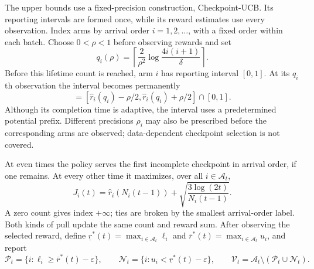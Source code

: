 \documentclass[11pt]{article}
\theoremstyle{remark}
\begin{document}
The upper bounds use a fixed-precision construction, Checkpoint-UCB. Its
reporting intervals are formed once, while its reward estimates use every
observation. Index arms by arrival order $i=1,2,\ldots$, with a fixed order
within each batch. Choose $0<\rho<1$ before observing rewards and set
\begin{equation}
 q_i(\rho)=\left\lceil\frac2{\rho^2}
                  \log\frac{4i(i+1)}\delta\right\rceil.
 \label{eq:checkpoint}
\end{equation}
Before this lifetime count is reached, arm $i$ has reporting interval $[0,1]$.
At its $q_i$th observation the interval becomes permanently
\begin{equation}
 [\ell_i,u_i]=[\hat r_i(q_i)-\rho/2,
                 \hat r_i(q_i)+\rho/2]\cap[0,1].
 \label{eq:fixed_interval}
\end{equation}
Although its completion time is adaptive, the
interval uses a predetermined potential prefix. Different precisions
$\rho_i$ may also be prescribed before the corresponding arms are observed;
data-dependent checkpoint selection is not covered.

At even times the policy serves the first incomplete checkpoint in arrival
order, if one remains. At every other time it maximizes, over all
$i\in\mathcal A_t$,
\begin{equation}
 J_i(t)=\hat r_i(N_i(t-1))+
             \sqrt{\frac{3\log(2t)}{N_i(t-1)}}.
 \label{eq:ucb}
\end{equation}
A zero count gives index $+\infty$; ties are broken by the smallest
arrival-order label. Both kinds of pull update the same count and reward
sum. After observing the selected reward, define
$\underline r^*(t)=\max_{i\in\mathcal A_t}\ell_i$ and
$\overline r^*(t)=\max_{i\in\mathcal A_t}u_i$, and report
\begin{equation}
 \mathcal P_t=\{i:\ell_i\ge\overline r^*(t)-\varepsilon\},\qquad
 \mathcal N_t=\{i:u_i<\underline r^*(t)-\varepsilon\},\qquad
 \mathcal V_t=\mathcal A_t\setminus(\mathcal P_t\cup\mathcal N_t).
 \label{eq:reports}
\end{equation}
\end{document}
